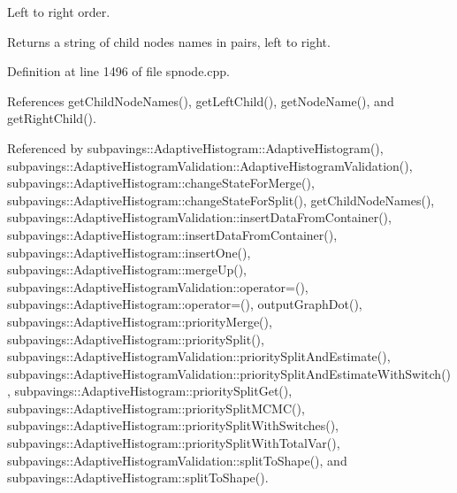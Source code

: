 \-Left to right order.

\begin{DoxyReturn}{\-Returns}
a string of child nodes names in pairs, left to right. 
\end{DoxyReturn}


\-Definition at line 1496 of file spnode.\-cpp.



\-References get\-Child\-Node\-Names(), get\-Left\-Child(), get\-Node\-Name(), and get\-Right\-Child().



\-Referenced by subpavings\-::\-Adaptive\-Histogram\-::\-Adaptive\-Histogram(), subpavings\-::\-Adaptive\-Histogram\-Validation\-::\-Adaptive\-Histogram\-Validation(), subpavings\-::\-Adaptive\-Histogram\-::change\-State\-For\-Merge(), subpavings\-::\-Adaptive\-Histogram\-::change\-State\-For\-Split(), get\-Child\-Node\-Names(), subpavings\-::\-Adaptive\-Histogram\-Validation\-::insert\-Data\-From\-Container(), subpavings\-::\-Adaptive\-Histogram\-::insert\-Data\-From\-Container(), subpavings\-::\-Adaptive\-Histogram\-::insert\-One(), subpavings\-::\-Adaptive\-Histogram\-::merge\-Up(), subpavings\-::\-Adaptive\-Histogram\-Validation\-::operator=(), subpavings\-::\-Adaptive\-Histogram\-::operator=(), output\-Graph\-Dot(), subpavings\-::\-Adaptive\-Histogram\-::priority\-Merge(), subpavings\-::\-Adaptive\-Histogram\-::priority\-Split(), subpavings\-::\-Adaptive\-Histogram\-Validation\-::priority\-Split\-And\-Estimate(), subpavings\-::\-Adaptive\-Histogram\-Validation\-::priority\-Split\-And\-Estimate\-With\-Switch(), subpavings\-::\-Adaptive\-Histogram\-::priority\-Split\-Get(), subpavings\-::\-Adaptive\-Histogram\-::priority\-Split\-M\-C\-M\-C(), subpavings\-::\-Adaptive\-Histogram\-::priority\-Split\-With\-Switches(), subpavings\-::\-Adaptive\-Histogram\-::priority\-Split\-With\-Total\-Var(), subpavings\-::\-Adaptive\-Histogram\-Validation\-::split\-To\-Shape(), and subpavings\-::\-Adaptive\-Histogram\-::split\-To\-Shape().


